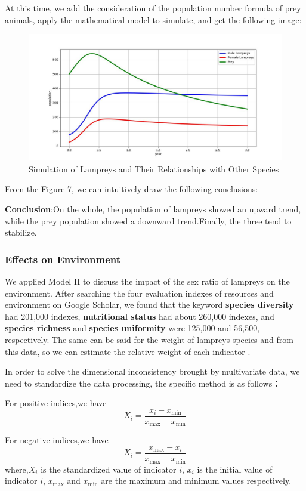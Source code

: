 \documentclass[12pt]{article}  %
\begin{document}
At this time, we add the consideration of the population number formula of prey animals, apply the mathematical model to simulate, and get the following image:

\begin{figure}[H]  %
	\centering  %
	\includegraphics[width=.6\textwidth]{test(1)(1).jpg} %
	\caption{Simulation of Lampreys and Their Relationships with Other Species}
\end{figure}
\vspace{-0.8cm}
From the Figure 7, we can intuitively draw the following conclusions:

\textbf{Conclusion}:On the whole, the population of lampreys showed an upward trend, while the prey population showed a downward trend.Finally, the three tend to stabilize.

\subsubsection{Effects on Environment}
We applied Model II to discuss the impact of the sex ratio of lampreys on the environment. After searching the four evaluation indexes of resources and environment on Google Scholar, we found that the keyword \textbf{species diversity} had 201,000 indexes, \textbf{nutritional status} had about 260,000 indexes, and\textbf{ species richness} and \textbf{species uniformity} were 125,000 and 56,500, respectively. The same can be said for the weight of lampreys species and from this data, so we can estimate the relative weight of each indicator .

In order to solve the dimensional inconsistency brought by multivariate data, we need to standardize the data processing, the specific method is as follows：

For positive indices,we have
\begin{equation}
	X_i=\frac{x_i-x_{\min}}{x_{\max}-x_{\min}}
\end{equation}

For  negative indices,we have
\begin{equation}
	X_i=\frac{x_{\max}-x_{i}}{x_{\max}-x_{\min}}
\end{equation}
where,$X_{i} $ is the standardized value of indicator $ i$, $x_{i} $ is the initial value of indicator $i$, $x_{\max}$ and $x_{\min}$ are the maximum and minimum values respectively.
\end{document}
